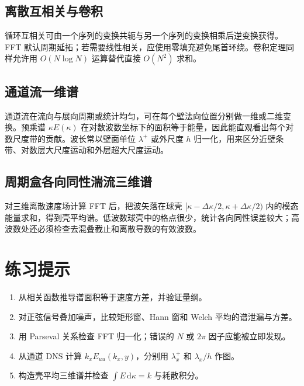 \documentclass[12pt,a4paper,openany,fontset=none]{ctexbook}
\newcommand{\dd}{\,\mathrm d}
\begin{document}
\subsection{离散互相关与卷积}

循环互相关可由一个序列的变换共轭与另一个序列的变换相乘后逆变换获得。FFT 默认周期延拓；若需要线性相关，应使用零填充避免尾首环绕。卷积定理同样允许用 $O(N\log N)$ 运算替代直接 $O(N^2)$ 求和。

\subsection{通道流一维谱}

通道流在流向与展向周期或统计均匀，可在每个壁法向位置分别做一维或二维变换。预乘谱 $\kappa E(\kappa)$ 在对数波数坐标下的面积等于能量，因此能直观看出每个对数尺度带的贡献。波长常以壁面单位 $\lambda^+$ 或外尺度 $h$ 归一化，用来区分近壁条带、对数层大尺度运动和外层超大尺度运动。

\subsection{周期盒各向同性湍流三维谱}

对三维离散速度场计算 FFT 后，把波矢落在球壳 $[\kappa-\Delta\kappa/2,\kappa+\Delta\kappa/2)$ 内的模态能量求和，得到壳平均谱。低波数球壳中的格点很少，统计各向同性误差较大；高波数处还必须检查去混叠截止和离散导数的有效波数。

\section*{练习提示}
\begin{enumerate}
 \item 从相关函数推导谱面积等于速度方差，并验证量纲。
 \item 对正弦信号叠加噪声，比较矩形窗、Hann 窗和 Welch 平均的谱泄漏与方差。
 \item 用 Parseval 关系检查 FFT 归一化；错误的 $N$ 或 $2\pi$ 因子应能被立即发现。
 \item 从通道 DNS 计算 $k_xE_{uu}(k_x,y)$，分别用 $\lambda_x^+$ 和 $\lambda_x/h$ 作图。
 \item 构造壳平均三维谱并检查 $\int E\dd\kappa=k$ 与耗散积分。
\end{enumerate}
\end{document}
